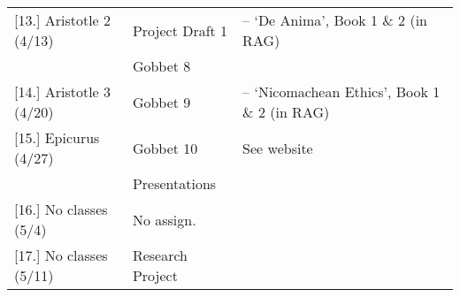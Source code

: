 \documentclass[article,oneside]{memoir}
\begin{document}
\begin{center}
\begin{longtable}{p{4.5cm}p{2cm}p{4.5cm}}
[13.] Aristotle 2  (4/13)			& Project Draft 1                & -- `De Anima', Book 1 \& 2 (in RAG) \\ 
			    				& Gobbet 8			& 					\\ [1.8\baselineskip] \hline

[14.] Aristotle 3  (4/20)			& Gobbet 9			& -- `Nicomachean Ethics', Book 1 \& 2 (in RAG) \\ [1.8\baselineskip] \hline
												 
[15.] Epicurus (4/27)				& Gobbet 10 &  See website \\ 
							& Presentations & \\  [1.8\baselineskip] \hline


[16.] No classes (5/4)			& No assign.			& \\ [1.8\baselineskip] \hline
	
[17.] No classes (5/11)			& Research Project 	& \\ [1.8\baselineskip] \hline

\end{longtable}
\end{center}
\end{document}
